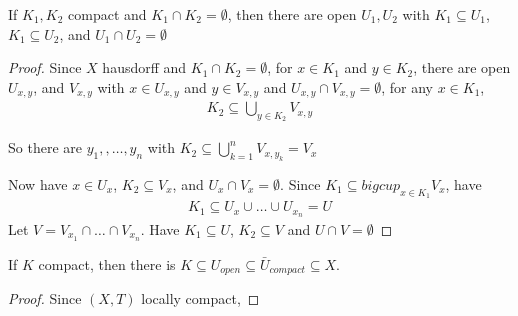 \begin{lemma}
	If $K_{1}, K_{2}$ compact and $K_{1} \cap K_2 = \emptyset$, then there are open $U_{1} , U_{2}$ with $K_{1} \subseteq U_{1}$, $K_{1} \subseteq U_{2}$, and $U_1 \cap U_2 = \emptyset$
\end{lemma}

\begin{proof}
	Since $X$ hausdorff and $K_1 \cap K_2 = \emptyset$, for  $x \in K_1$ and $y \in K_2$, there are open $U_{x,y}$, and $V_{x,y}$ with $x \in U_{x,y}$ and $y \in V_{x,y}$ and $U_{x,y} \cap V_{x,y} = \emptyset$, for any $x \in K_1$,
	\begin{align*}
		K_2 \subseteq \bigcup_{y \in K_2} V_{x,y}
	\end{align*} 

	So there are $y_1, ,\ldots , y_n$ with $K_2 \subseteq \bigcup_{k=1}^n V_{x, y_{k}} = V_{x}$

	Now have $x \in U_{x}$, $K_2 \subseteq V_x$, and $U_{x} \cap V_{x} = \emptyset$. Since $K_{1} \subseteq bigcup_{x \in K_1} V_x$, have 
	\begin{align*}
		K_1 \subseteq U_{x} \cup \ldots \cup U_{x_{n}} = U
	\end{align*} 
	Let $V = V_{x_{1}} \cap \ldots \cap V_{x_{n}}$. Have $K_{1} \subseteq U$, $K_{2} \subseteq V$ and $U \cap V = \emptyset$
\end{proof}

\begin{lemma}
	If $K$ compact, then there is $K \subseteq U_{open} \subseteq \bar{U}_{compact} \subseteq X$.
\end{lemma}

\begin{proof}
	Since $(X,T)$ locally compact,
\end{proof}


